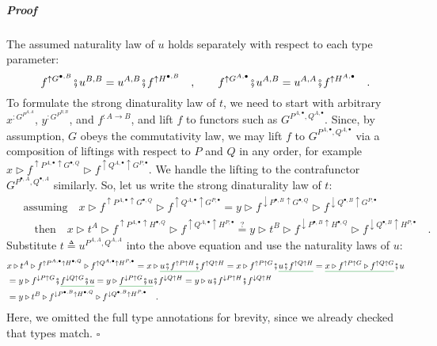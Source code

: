\subparagraph{Proof}

The assumed naturality law of $u$ holds separately with respect to
each type parameter:
\[
f^{\uparrow G^{\bullet,B}}\bef u^{B,B}=u^{A,B}\bef f^{\uparrow H^{\bullet,B}}\quad,\quad\quad f^{\uparrow G^{A,\bullet}}\bef u^{A,B}=u^{A,A}\bef f^{\uparrow H^{A,\bullet}}\quad.
\]
To formulate the strong dinaturality law of $t$, we need to start
with arbitrary $x^{:G^{P^{A,A}}}$, $y^{:G^{P^{B,B}}}$, and $f^{:A\rightarrow B}$,
and lift $f$ to functors such as $G^{P^{A,\bullet},Q^{A,\bullet}}$.
Since, by assumption, $G$ obeys the commutativity law, we may lift
$f$ to $G^{P^{A,\bullet},Q^{A,\bullet}}$ via a composition of liftings
with respect to $P$ and $Q$ in any order, for example $x\triangleright f^{\uparrow P^{A,\bullet}\uparrow G^{\bullet,Q}}\triangleright f^{\uparrow Q^{A,\bullet}\uparrow G^{P,\bullet}}$.
We handle the lifting to the contrafunctor $G^{P^{\bullet,A},Q^{\bullet,A}}$
similarly. So, let us write the strong dinaturality law of $t$: 
\begin{align*}
 & \text{ assuming}\quad x\triangleright f^{\uparrow P^{A,\bullet}\uparrow G^{\bullet,Q}}\triangleright f^{\uparrow Q^{A,\bullet}\uparrow G^{P,\bullet}}=y\triangleright f^{\downarrow P^{\bullet,B}\uparrow G^{\bullet,Q}}\triangleright f^{\downarrow Q^{\bullet,B}\uparrow G^{P,\bullet}}\\
 & \quad\text{ then}\quad x\triangleright t^{A}\triangleright f^{\uparrow P^{A,\bullet}\uparrow H^{\bullet,Q}}\triangleright f^{\uparrow Q^{A,\bullet}\uparrow H^{P,\bullet}}\overset{?}{=}y\triangleright t^{B}\triangleright f^{\downarrow P^{\bullet,B}\uparrow H^{\bullet,Q}}\triangleright f^{\downarrow Q^{\bullet,B}\uparrow H^{P,\bullet}}\quad.
\end{align*}
Substitute $t\triangleq u^{P^{A,A},Q^{A,A}}$ into the above equation
and use the naturality laws of $u$:
\begin{align*}
 & x\triangleright t^{A}\triangleright f^{\uparrow P^{A,\bullet}\uparrow H^{\bullet,Q}}\triangleright f^{\uparrow Q^{A,\bullet}\uparrow H^{P,\bullet}}=x\triangleright\gunderline{u\bef f^{\uparrow P\uparrow H}\bef}f^{\uparrow Q\uparrow H}=x\triangleright f^{\uparrow P\uparrow G}\bef\gunderline{u\bef f^{\uparrow Q\uparrow H}}=\gunderline{x\triangleright f^{\uparrow P\uparrow G}\triangleright f^{\uparrow Q\uparrow G}}\bef u\\
 & =y\triangleright f^{\downarrow P\uparrow G}\bef\gunderline{f^{\downarrow Q\uparrow G}\bef u}=y\triangleright\gunderline{f^{\downarrow P\uparrow G}\bef u}\bef f^{\downarrow Q\uparrow H}=y\triangleright u\bef f^{\downarrow P\uparrow H}\bef f^{\downarrow Q\uparrow H}\\
 & =y\triangleright t^{B}\triangleright f^{\downarrow P^{\bullet,B}\uparrow H^{\bullet,Q}}\triangleright f^{\downarrow Q^{\bullet,B}\uparrow H^{P,\bullet}}\quad.
\end{align*}
Here, we omitted the full type annotations for brevity, since we already
checked that types match. $\square$

